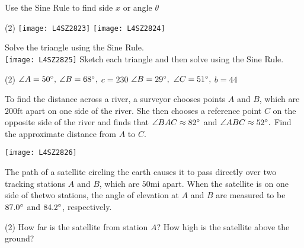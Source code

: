 \begin{Exercise}[title={Applications},label=exApplications]
	\Question Use the Sine Rule to find side $x$ or angle $\theta $ 
	\begin{tasks}(2)
		\task 	\texttt{[image: L4SZ2823]}%
		\task 	\texttt{[image: L4SZ2824]}%
	\end{tasks}
\clearpage
	\Question Solve the triangle using the Sine Rule.  \\
	\texttt{[image: L4SZ2825]}%
		\Question Sketch each triangle and then solve using the Sine Rule. 
	\begin{tasks}(2)
		\task 	$\angle A =50 \mbox{{\ensuremath{{}^\circ}}}\text{,}$ $\angle B =68 \mbox{{\ensuremath{{}^\circ}}}\text{,}$ $c =230$%
		\task 	$\angle B =29 \mbox{{\ensuremath{{}^\circ}}}\text{,}$ $\angle C =51 \mbox{{\ensuremath{{}^\circ}}}\text{,}$ $b =44$%
	\end{tasks}
\begin{multicols}{2}
	\Question To find the distance across a river, a surveyor chooses points $A$ and $B$, which are $200 \mbox{ft}$ apart on one side of the river. She then chooses a reference point $C$ on the opposite side of the river and finds that $\angle BAC \approx 82 \mbox{{\ensuremath{{}^\circ}}}$ and $\angle ABC \approx 52 \mbox{{\ensuremath{{}^\circ}}}\text{.}$  Find the approximate distance from $A$ to $C$. \\%
	\columnbreak 
	
\texttt{[image: L4SZ2826]}	\\
\end{multicols}

	\Question The path of a satellite circling the earth causes it to pass directly over two tracking stations $A$ and $B$, which are $50 \mbox{mi}$ apart. When the satellite is on one side of thetwo stations, the angle of elevation at $A$ and $B$ are measured to be $87.0 \mbox{{\ensuremath{{}^\circ}}}$ and $84.2 \mbox{{\ensuremath{{}^\circ}}}$, respectively.  
\begin{tasks}(2)
	\task How far is the satellite from	station $A$?%
	\task How high is the satellite	above the ground?%
\end{tasks}
	

\end{Exercise}
